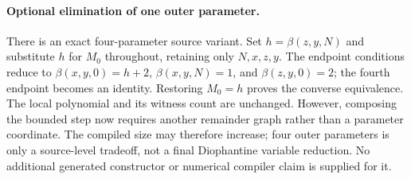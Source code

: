 \paragraph{Optional elimination of one outer parameter.}
There is an exact four-parameter source variant. Set
$h=\beta(z,y,N)$ and substitute $h$ for $M_0$ throughout, retaining only
$N,x,z,y$. The endpoint conditions reduce to
$\beta(x,y,0)=h+2$, $\beta(x,y,N)=1$, and $\beta(z,y,0)=2$;
the fourth endpoint becomes an identity. Restoring $M_0=h$ proves the
converse equivalence. The local polynomial and its witness count are
unchanged. However, composing the bounded step now requires another
remainder graph rather than a parameter coordinate. The compiled size
may therefore increase; four outer parameters is only a source-level
tradeoff, not a final Diophantine variable reduction. No additional
generated constructor or numerical compiler claim is supplied for it.
